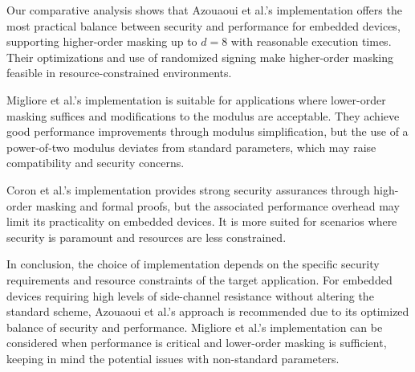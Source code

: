Our comparative analysis shows that Azouaoui et al.'s implementation offers the most practical balance between security and performance for embedded devices, supporting higher-order masking up to $d=8$ with reasonable execution times. Their optimizations and use of randomized signing make higher-order masking feasible in resource-constrained environments.

Migliore et al.'s implementation is suitable for applications where lower-order masking suffices and modifications to the modulus are acceptable. They achieve good performance improvements through modulus simplification, but the use of a power-of-two modulus deviates from standard parameters, which may raise compatibility and security concerns.

Coron et al.'s implementation provides strong security assurances through high-order masking and formal proofs, but the associated performance overhead may limit its practicality on embedded devices. It is more suited for scenarios where security is paramount and resources are less constrained.

In conclusion, the choice of implementation depends on the specific security requirements and resource constraints of the target application. For embedded devices requiring high levels of side-channel resistance without altering the standard scheme, Azouaoui et al.'s approach is recommended due to its optimized balance of security and performance. Migliore et al.'s implementation can be considered when performance is critical and lower-order masking is sufficient, keeping in mind the potential issues with non-standard parameters.

% 
% 

